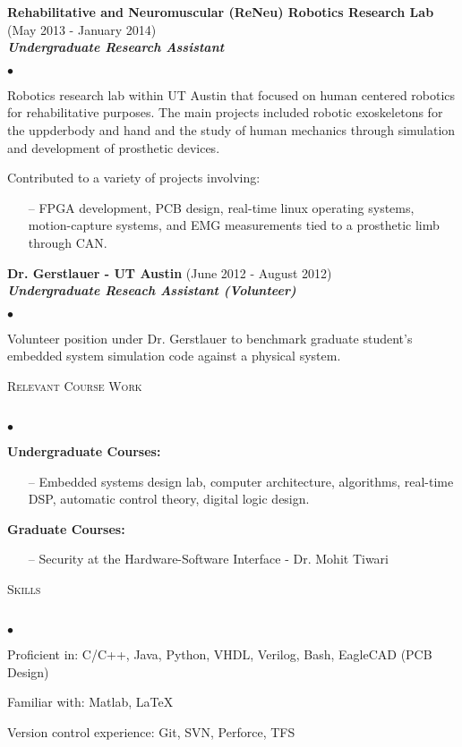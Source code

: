 \documentclass[11pt]{article}
\newcommand{\lineunder}{\vspace*{-8pt} \\ \hspace*{-18pt} \hrulefill \\}
\newcommand{\header}[1]{{\hspace*{-10pt}\vspace*{6pt} \textsc{#1}} \vspace*{-6pt} \lineunder}
\newcommand{\employer}[3]{{ \textbf{#1} (#2)\\ \textbf{\emph{#3}}}\\  }
\newenvironment{achievements}{\begin{list}{$\bullet$}{\topsep 0pt \itemsep -2pt}}{\vspace*{4pt}\end{list}}
\begin{document}
\employer{Rehabilitative and Neuromuscular (ReNeu) Robotics Research Lab}{May 2013 - January 2014}{Undergraduate Research Assistant}
	\begin{achievements}
    \item Robotics research lab within UT Austin that focused on human centered robotics for rehabilitative purposes. The main projects included robotic exoskeletons for the uppderbody and hand and the study of human mechanics through simulation and development of prosthetic devices. 
	\item Contributed to a variety of projects involving:
    	\begin{enumerate}
        	\item[--] FPGA development, PCB design, real-time linux operating systems, motion-capture systems, and EMG measurements tied to a prosthetic limb through CAN.
        \end{enumerate}
	\end{achievements}

\employer{Dr. Gerstlauer - UT Austin}{June 2012 - August 2012}{Undergraduate Reseach Assistant (Volunteer)}
	\begin{achievements}
	\item Volunteer position under Dr. Gerstlauer to benchmark graduate student’s embedded system simulation code against a physical system.
	\end{achievements}

\header{Relevant Course Work}
	\begin{achievements}
    \item \textbf{Undergraduate Courses:}
    	\begin{enumerate}
        	\item[--] Embedded systems design lab, computer architecture,  algorithms, real-time DSP, automatic control theory, digital logic design.
        \end{enumerate}
        
    \item \textbf{Graduate Courses:} 
        \begin{enumerate}
        	\item[--] Security at the Hardware-Software Interface - Dr. Mohit Tiwari
        \end{enumerate}
    \end{achievements}

\header{Skills}
\begin{achievements}
	\item Proficient in: C/C++, Java, Python, VHDL, Verilog, Bash, EagleCAD (PCB Design)
    \item Familiar with: Matlab, \LaTeX
    \item Version control experience: Git, SVN, Perforce, TFS
\end{achievements}
\end{document}
